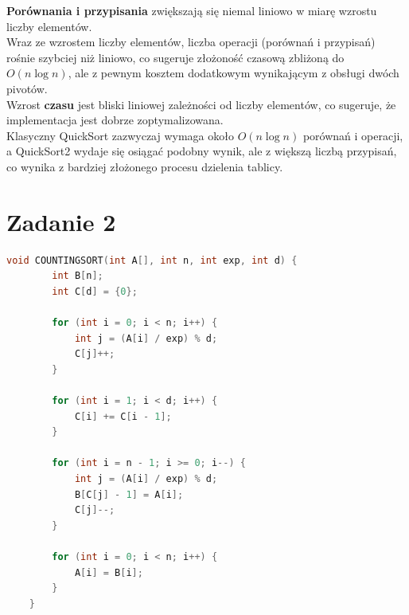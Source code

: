 \documentclass{article}
\begin{document}
		\textbf{Porównania i przypisania} zwiększają się niemal liniowo w miarę wzrostu liczby elementów. \\
		Wraz ze wzrostem liczby elementów, liczba operacji (porównań i przypisań) rośnie szybciej niż liniowo, co sugeruje złożoność czasową zbliżoną do \( O(n \log n) \), ale z pewnym kosztem dodatkowym wynikającym z obsługi dwóch pivotów.\\
		Wzrost \textbf{czasu} jest bliski liniowej zależności od liczby elementów, co sugeruje, że implementacja jest dobrze zoptymalizowana. \\
		Klasyczny QuickSort zazwyczaj wymaga około \( O(n \log n) \) porównań i operacji, a QuickSort2 wydaje się osiągać podobny wynik, ale z większą liczbą przypisań, co wynika z bardziej złożonego procesu dzielenia tablicy.
		
		\newpage
		\section*{Zadanie 2}
		
		\begin{lstlisting}[language=C++, tabsize=3]
	void COUNTINGSORT(int A[], int n, int exp, int d) {
		int B[n];        
		int C[d] = {0};  
		
		for (int i = 0; i < n; i++) {
			int j = (A[i] / exp) % d;
			C[j]++;
		}
		
		for (int i = 1; i < d; i++) {
			C[i] += C[i - 1];
		}
		
		for (int i = n - 1; i >= 0; i--) {
			int j = (A[i] / exp) % d;
			B[C[j] - 1] = A[i];
			C[j]--;
		}
		
		for (int i = 0; i < n; i++) {
			A[i] = B[i];
		}
	}
		\end{lstlisting}
		
\end{document}
